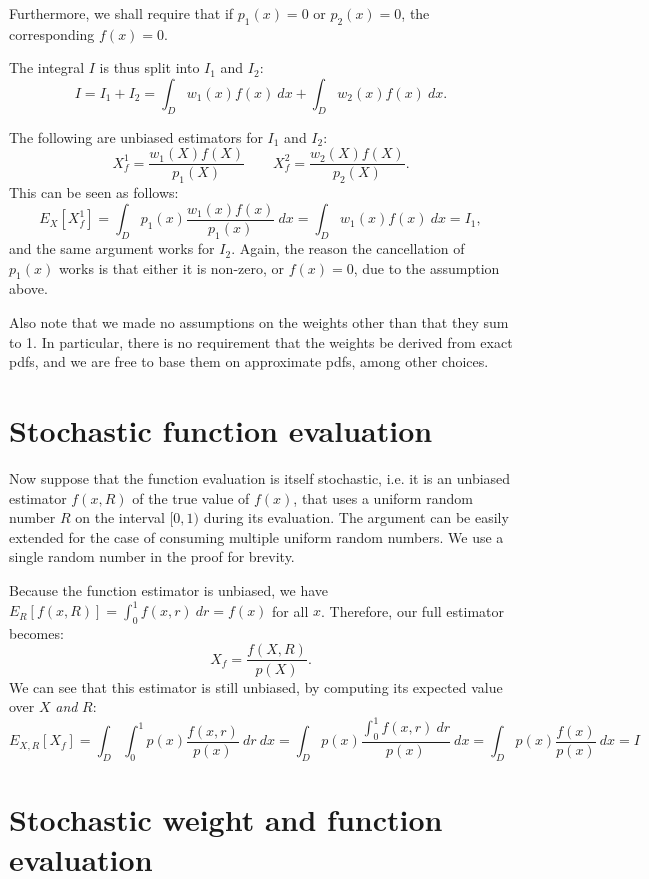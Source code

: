 \documentclass[11pt]{article}
\begin{document}
Furthermore, we shall require that if $p_1(x) = 0$ or $p_2(x) = 0$, the corresponding $f(x) = 0$.

The integral $I$ is thus split into $I_1$ and $I_2$:
\[
I = I_1 + I_2 = \int_D w_1(x) f(x) \ dx + \int_D w_2(x) f(x) \ dx.
\]

The following are unbiased estimators for $I_1$ and $I_2$:
\[
X_f^1 = \frac{w_1(X)f(X)}{p_1(X)} \qquad X_f^2 = \frac{w_2(X)f(X)}{p_2(X)}.
\]
This can be seen as follows:
\[
E_X[X_f^1] = \int_D p_1(x) \frac{w_1(x)f(x)}{p_1(x)} \ dx = \int_D w_1(x) f(x) \ dx = I_1,
\]
and the same argument works for $I_2$. Again, the reason the cancellation of $p_1(x)$ works is that either it is non-zero, or $f(x) = 0$, due to the assumption above.

Also note that we made no assumptions on the weights other than that they sum to 1. In particular, there is no requirement that the weights be derived from exact pdfs, and we are free to base them on approximate pdfs, among other choices.


\section{Stochastic function evaluation}

Now suppose that the function evaluation is itself stochastic, i.e. it is an unbiased estimator $f(x,R)$ of the true value of $f(x)$, that uses a uniform random number $R$ on the interval $[0,1)$ during its evaluation. The argument can be easily extended for the case of consuming multiple uniform random numbers. We use a single random number in the proof for brevity.

Because the function estimator is unbiased, we have $E_R[f(x,R)] = \int_0^1 f(x,r) \ dr = f(x)$ for all $x$. Therefore, our full estimator becomes:
\[
X_f = \frac{f(X,R)}{p(X)}.
\]
We can see that this estimator is still unbiased, by computing its expected value over $X$ \emph{and} $R$:
\[
E_{X,R}[X_f] = \int_D \int_0^1 p(x) \frac{f(x,r)}{p(x)} \ dr \ dx = \int_D p(x) \frac{\int_0^1 f(x,r) \ dr}{p(x)} \ dx = \int_D p(x) \frac{f(x)}{p(x)} \ dx = I
\]



\section{Stochastic weight and function evaluation}
\end{document}
